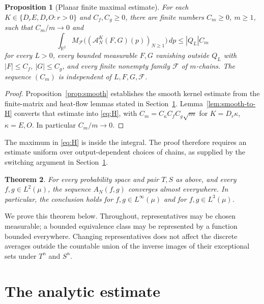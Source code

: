 \documentclass[11pt,a4paper]{article}
\newtheorem{theorem}{Theorem}
\newtheorem{proposition}[theorem]{Proposition}
\theoremstyle{definition}
\newenvironment{statementframe}
  {\par\addvspace{4pt}\noindent
   \setlength{\fboxsep}{6pt}\setlength{\fboxrule}{0.45pt}%
   \begin{lrbox}{\statementbox}%
   \begin{minipage}{\dimexpr\linewidth-2\fboxsep-2\fboxrule\relax}}
  {\end{minipage}\end{lrbox}%
   \fbox{\usebox{\statementbox}}\par\addvspace{4pt}}
\newcommand{\R}{\mathbb R}
\newcommand{\1}{\mathbf1}
\newcommand{\A}{\mathcal A}
\newcommand{\F}{\mathcal F}
\begin{document}
\begin{statementframe}
\begin{proposition}[Planar finite maximal estimate]\label{prop:planar}
For each $K\in\{D_rE,D_rO:r>0\}$ and $C_f,C_g\ge0$, there are finite
numbers $C_m\ge0$, $m\ge1$, such that $C_m/m\to0$ and
\begin{equation}\label{eq:H}
 \int_{\R^2} M_{\F}\bigl((\A_N^K(F,G)(p))_{N\ge1}\bigr)\,dp
 \le |Q_L|C_m
\end{equation}
for every $L>0$, every bounded measurable $F,G$ vanishing outside $Q_L$
with $|F|\le C_f$, $|G|\le C_g$, and every finite nonempty family $\F$
of $m$-chains. The sequence $(C_m)$ is independent of $L,F,G,\F$.
\end{proposition}
\end{statementframe}
\begin{proof}
Proposition~\ref{prop:smooth} establishes the smooth kernel estimate
from the finite-matrix and heat-flow lemmas stated in
Section~\ref{sec:analytic}. Lemma~\ref{lem:smooth-to-H} converts that
estimate into \eqref{eq:H}, with $C_m=C_\kappa C_fC_g\sqrt m$ for
$K=D_r\kappa$, $\kappa=E,O$. In particular $C_m/m\to0$.
\end{proof}

The maximum in \eqref{eq:H} is inside the integral. The proof therefore
requires an estimate uniform over output-dependent choices of chains,
as supplied by the switching argument in Section~\ref{sec:analytic}.

\begin{statementframe}
\begin{theorem}\label{thm:main}
For every probability space and pair $T,S$ as above,
and every $f,g\in L^2(\mu)$, the sequence $A_N(f,g)$ converges almost
everywhere. In particular, the conclusion holds for
$f,g\in L^\infty(\mu)$ and for $f,g\in L^3(\mu)$.
\end{theorem}
\end{statementframe}

We prove this theorem below. Throughout, representatives may be chosen
measurable; a bounded equivalence class may be represented by a function
bounded everywhere. Changing representatives does not affect the discrete
averages outside the countable union of the inverse images of their
exceptional sets under $T^n$ and $S^n$.

\section{The analytic estimate}\label{sec:analytic}
\end{document}
